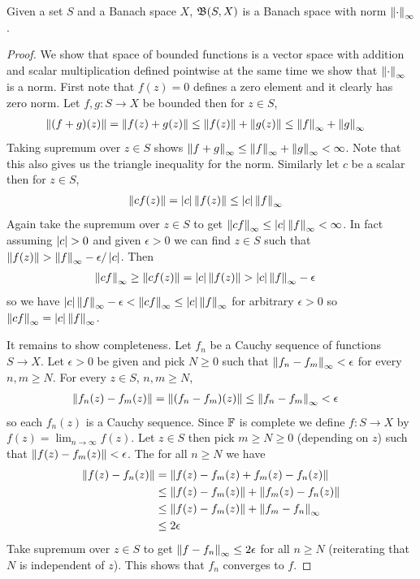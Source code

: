 \begin{prop}Given a set $S$ and a Banach space $X$,
  $\mathfrak{B}(S, X)$ is a Banach space with norm $\left \lVert \cdot \right \rVert_\infty$.
\end{prop}
\begin{proof}
We show that space of bounded functions is a vector space with
addition and scalar multiplication defined pointwise at the same time
we show that $\left \lVert  \cdot  \right \rVert_\infty$ is a norm.   First note that
$f(z) = 0$ defines a zero element and it clearly has zero norm.  Let
$f,g: S \to X$ be bounded then for $z \in S$,
\begin{align*}
  \left \lVert (f+g)(z) \right \rVert &=  \left \lVert f(z)+g(z) \right \rVert \leq \left \lVert f(z) \right \rVert +\left \lVert g(z) \right \rVert
                    \leq \left \lVert f \right \rVert_\infty + \left \lVert g \right \rVert_\infty
\end{align*}
Taking supremum over $z \in S$ shows $\left \lVert f+g \right \rVert_\infty \leq
\left \lVert f \right \rVert_\infty + \left \lVert g \right \rVert_\infty < \infty$.  Note that this also
gives us the triangle inequality for the norm.
Similarly let $c$ be a scalar then for $z \in S$,
\begin{align*}
  \left \lVert cf(z) \right \rVert &= \left \vert c \right \vert \left \lVert f(z) \right \rVert \leq \left \vert c \right \vert \left \lVert f \right \rVert_\infty
\end{align*}
Again take the supremum over $z \in S$ to get $\left \lVert cf \right \rVert_\infty \leq
\left \vert c \right \vert\left \lVert f \right \rVert_\infty < \infty$.   In fact assuming $\left \vert c \right \vert > 0$ and
given $\epsilon > 0$ we
can find $z \in S$ such that $\left \lVert f(z) \right \rVert > \left \lVert f \right \rVert_\infty -
\epsilon/\left \vert c \right \vert$.   Then
\begin{align*}
  \left \lVert cf \right \rVert_\infty &\geq \left \lVert cf(z) \right \rVert = \left \vert c \right \vert\left \lVert f(z) \right \rVert >
                     \left \vert c \right \vert\left \lVert f \right \rVert_\infty - \epsilon
\end{align*}
so we have $\left \vert c \right \vert\left \lVert f \right \rVert_\infty - \epsilon < \left \lVert cf \right \rVert_\infty \leq \left \vert c \right \vert\left \lVert f \right \rVert_\infty$
for arbitrary $\epsilon>0$ so $\left \lVert cf \right \rVert_\infty =
\left \vert c \right \vert\left \lVert f \right \rVert_\infty$.

It remains to show completeness.   Let $f_n$ be a Cauchy sequence of
functions $S \to X$.   Let $\epsilon > 0$ be given and pick $N \geq 0$
such that $\left \lVert f_n - f_m \right \rVert_\infty < \epsilon$ for every $n, m \geq
N$.  For every $z \in S$, $n,m\geq N$,
\begin{align*}
  \left \lVert f_n(z) - f_m(z) \right \rVert &= \left \lVert (f_n-f_m)(z) \right \rVert \leq \left \lVert f_n- f_m \right \rVert_\infty < \epsilon
\end{align*}
so each $f_n(z)$ is a Cauchy sequence.   Since $\mathbb{F}$ is complete we
define $f : S \to X$ by $f(z) = \lim_{n \to \infty} f(z)$.   Let $z
\in S$ then pick $m \geq N \geq 0$ (depending on $z$) such that $\left \lVert f(z) -
  f_m(z) \right \rVert < \epsilon$.
The for all $n \geq N$ we have
\begin{align*}
  \left \lVert f(z) - f_n(z) \right \rVert &= \left \lVert f(z) - f_m(z) + f_m(z) - f_n(z) \right \rVert \\
                       &\leq \left \lVert f(z) - f_m(z) \right \rVert + \left \lVert f_m(z) - f_n(z) \right \rVert\\
                       &\leq \left \lVert f(z) - f_m(z) \right \rVert + \left \lVert f_m - f_n \right \rVert_\infty \\
                       &\leq 2\epsilon
\end{align*}
Take supremum over $z \in S$ to get $\left \lVert f - f_n \right \rVert_\infty \leq 2
\epsilon$ for all $n \geq N$ (reiterating that $N$ is independent of
$z$).  This shows that $f_n$ converges to $f$.
\end{proof}

